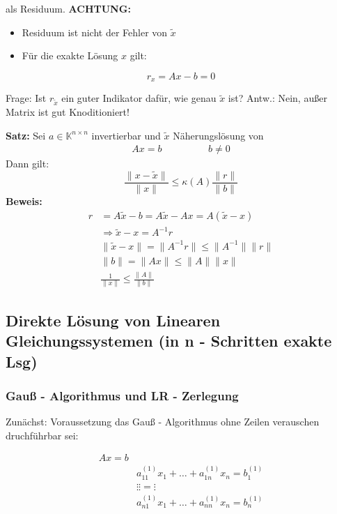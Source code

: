 als Residuum.
\textbf{ACHTUNG:}
\begin{itemize}
  \item{Residuum ist nicht der Fehler von $\widetilde{x}$}
	\item{Für die exakte Lösung $x$ gilt:}
\end{itemize}
\begin{equation*}
r_x = Ax - b = 0
\end{equation*}

Frage: Ist $r_{\widetilde{x}}$ ein guter Indikator dafür, wie genau $\widetilde{x}$ ist?
Antw.: Nein, außer Matrix ist gut Knoditioniert!

\textbf{Satz:}
Sei $a \in \mathbb{K}^{n \times n}$ invertierbar und $\widetilde{x}$ Näherungslösung von
\begin{equation*}
\begin{aligned}
Ax = b \hspace{2cm} b \neq 0
\end{aligned}
\end{equation*}
Dann gilt:
\begin{equation*}
\frac{\|x - \widetilde{x}\|}{\|x\|} \leq \kappa\left(A\right) \frac{\|r\|}{\|b\|}
\end{equation*}
\textbf{Beweis:}
\begin{equation*}
\begin{aligned}
r &= A\widetilde{x} - b = A\widetilde{x} - Ax = A\left(\widetilde{x} - x\right) \\
&\Rightarrow \widetilde{x} - x = A^{-1}r \\
&\|\widetilde{x} - x\| = \|A^{-1}r\| \leq \|A^{-1}\|\|r\| \\
&\|b\| = \|Ax\| \leq \|A\|\|x\| \\
&\frac{1}{\|x\|} \leq \frac{\|A\|}{\|b\|}
\end{aligned}
\end{equation*}

\subsection{Direkte Lösung von Linearen Gleichungssystemen (in n - Schritten exakte Lsg)}
\subsubsection{Gauß - Algorithmus und LR - Zerlegung}
Zunächst: Voraussetzung das Gauß - Algorithmus ohne Zeilen verauschen druchführbar sei:

\begin{equation*}
  \begin{aligned}
    Ax = b \\
    &a_{11}^{\left(1\right)}x_1 + \ldots + a_{1n}^{\left(1\right)}x_n = b_1^{\left(1\right)}  \\
    &\vdots                               \vdots                     = \vdots  \\
    &a_{n1}^{(1)}x_1 + \ldots + a_{nn}^{(1)}x_n = b_n^{(1)}  \\
  \end{aligned}
\end{equation*}

